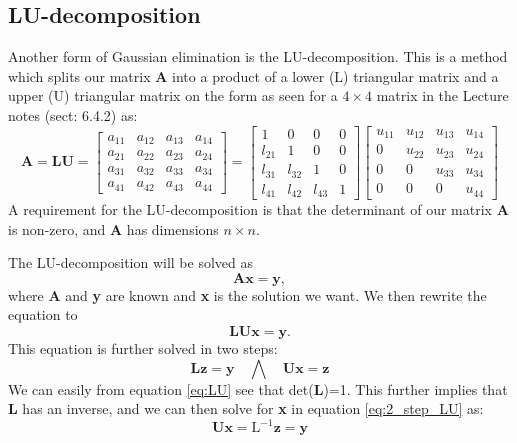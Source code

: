 \documentclass[12pt,a4paper,english]{article}
\begin{document}
\subsection{LU-decomposition}
Another form of Gaussian elimination is the LU-decomposition. This is a method which splits our matrix \textbf{A} into a product of a lower (L) triangular matrix and a upper (U) triangular matrix on the form as seen for a $4\times4$ matrix in the Lecture notes \cite{notes} (sect: 6.4.2) as:
\begin{equation}
\label{eq:LU}
\textbf{A}=\textbf{LU}=
\begin{bmatrix}
a_{11} & a_{12} & a_{13} & a_{14}\\
a_{21} & a_{22} & a_{23} & a_{24}\\
a_{31} & a_{32} & a_{33} & a_{34}\\
a_{41} & a_{42} & a_{43} & a_{44}
\end{bmatrix}=
\begin{bmatrix}
1 & 0 & 0 & 0\\
l_{21} & 1 & 0 & 0\\
l_{31} & l_{32} & 1 & 0\\
l_{41} & l_{42} & l_{43} & 1
\end{bmatrix}
\begin{bmatrix}
u_{11} & u_{12} & u_{13} & u_{14}\\
0 & u_{22} & u_{23} & u_{24}\\
0 & 0 & u_{33} & u_{34}\\
0 & 0 & 0 & u_{44}
\end{bmatrix}
\end{equation}
A requirement for the LU-decomposition is that the  determinant of our matrix \textbf{A} is non-zero, and \textbf{A} has dimensions $n\times n$.

The LU-decomposition will be solved as 
\begin{equation}
\textbf{Ax}=\textbf{y},
\end{equation}
where \textbf{A} and \textbf{y} are known and \textbf{x} is the solution we want. We then rewrite the equation to
\begin{equation}
\textbf{LUx}= \textbf{y}.
\end{equation}
This equation is further solved in two steps:
\begin{equation}
\label{eq:2_step_LU}
\textbf{Lz}=\textbf{y}\quad \bigwedge\quad \textbf{Ux}=\textbf{z}
\end{equation}
We can easily from equation \ref{eq:LU} see that det(\textbf{L})=1. This further implies that \textbf{L} has an inverse, and we can then solve for \textbf{x} in equation \ref{eq:2_step_LU} as:
\begin{equation}
\label{eq:inv_L}
\textbf{Ux}=\text{L}^{-1}\textbf{z}=\textbf{y}
\end{equation}
\end{document}
